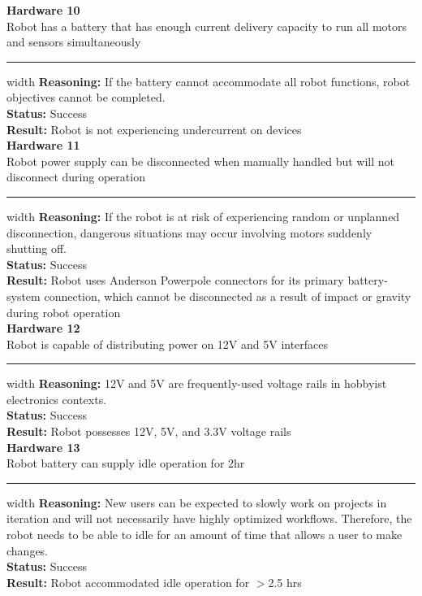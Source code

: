 \documentclass{fank1basedocument}
\begin{document}
{\large \textbf{Hardware 10}}\\
Robot has a battery that has enough current delivery capacity to run all motors and sensors simultaneously
\hrule width \linewidth
\vspace{2px}
\textbf{Reasoning:} If the battery cannot accommodate all robot functions, robot objectives cannot be completed.\\
\textbf{Status:} \color{ForestGreen}Success\color{black}\\
\textbf{Result:} Robot is not experiencing undercurrent on devices\\

{\large \textbf{Hardware 11}}\\
Robot power supply can be disconnected when manually handled but will not disconnect during operation
\hrule width \linewidth
\vspace{2px}
\textbf{Reasoning:} If the robot is at risk of experiencing random or unplanned disconnection, dangerous situations may occur involving motors suddenly shutting off.\\
\textbf{Status:} \color{ForestGreen}Success\color{black}\\
\textbf{Result:} Robot uses Anderson Powerpole connectors for its primary battery- system connection, which cannot be disconnected as a result of impact or gravity during robot operation\\

{\large \textbf{Hardware 12}}\\
Robot is capable of distributing power on 12V and 5V interfaces
\hrule width \linewidth
\vspace{2px}
\textbf{Reasoning:} 12V and 5V are frequently-used voltage rails in hobbyist electronics contexts.\\
\textbf{Status:} \color{ForestGreen}Success\color{black}\\
\textbf{Result:} Robot possesses 12V, 5V, and 3.3V voltage rails\\

{\large \textbf{Hardware 13}}\\
Robot battery can supply idle operation for 2hr
\hrule width \linewidth
\vspace{2px}
\textbf{Reasoning:} New users can be expected to slowly work on projects in iteration and will not necessarily have highly optimized workflows. Therefore, the robot needs to be able to idle for an amount of time that allows a user to make changes.\\
\textbf{Status:} \color{ForestGreen}Success\color{black}\\
\textbf{Result:} Robot accommodated idle operation for $>$2.5 hrs\\
\end{document}
